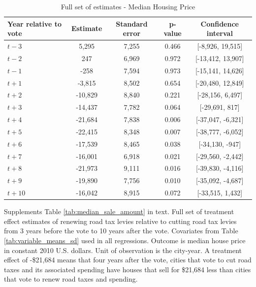 \begin{table}[htbp]
    \centering
    \caption{Full set of estimates - Median Housing Price}
    \label{tab:median_sale_amount_full}
    \begin{tabular}{p{3cm}cccc}
        \hline
        \textbf{Year relative to vote} & \textbf{Estimate} & \textbf{Standard error} & \textbf{p-value} & \textbf{Confidence interval} \\
        \hline
        $t - 3$  & 5,295   & 7,255  & 0.466  & [-8,926, 19,515] \\
        $t - 2$  & 247     & 6,969  & 0.972  & [-13,412, 13,907] \\
        $t - 1$  & -258    & 7,594  & 0.973  & [-15,141, 14,626] \\
        $t + 1$  & -3,815  & 8,502  & 0.654  & [-20,480, 12,849] \\
        $t + 2$  & -10,829 & 8,840  & 0.221  & [-28,156, 6,497] \\
        $t + 3$  & -14,437 & 7,782  & 0.064  & [-29,691, 817] \\
        $t + 4$  & -21,684 & 7,838  & 0.006  & [-37,047, -6,321] \\
        $t + 5$  & -22,415 & 8,348  & 0.007  & [-38,777, -6,052] \\
        $t + 6$  & -17,539 & 8,465  & 0.038  & [-34,130, -947] \\
        $t + 7$  & -16,001 & 6,918  & 0.021  & [-29,560, -2,442] \\
        $t + 8$  & -21,973 & 9,111  & 0.016  & [-39,830, -4,116] \\
        $t + 9$  & -19,890 & 7,756  & 0.010  & [-35,092, -4,687] \\
        $t + 10$ & -16,042 & 8,915  & 0.072  & [-33,515, 1,432] \\
        \hline
    \end{tabular}
    \begin{tablenotes}
        \small
        \item Supplements Table \ref{tab:median_sale_amount} in text. Full set of treatment effect estimates of renewing road tax levies relative to cutting road tax levies from 3 years before the vote to 10 years after the vote. Covariates from Table \ref{tab:variable_means_sd} used in all regressions. Outcome is median house price in constant 2010 U.S. dollars. Unit of observation is the city-year. A treatment effect of -\$21,684 means that four years after the vote, cities that vote to cut road taxes and its associated spending have houses that sell for \$21,684 less than cities that vote to renew road taxes and spending.
    \end{tablenotes}
\end{table}

